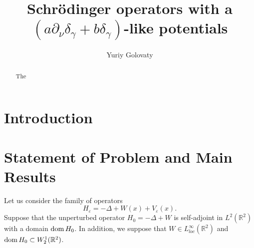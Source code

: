 \documentclass[reqno]{amsart}
\theoremstyle{plain}
\numberwithin{equation}{section}
\newcommand{\dom}{\mathop{\rm dom}}
\newcommand{\Real}{\mathbb R}
\newcommand{\eps}{\varepsilon}
\begin{document}
\title[Schr\"{o}dinger operators with a $(a\partial_\nu\delta_\gamma+b\delta_\gamma)$-like potentials]
{Schr\"{o}dinger operators with a $(a\partial_\nu\delta_\gamma+b\delta_\gamma)$-like potentials}





\author{Yuriy Golovaty}%
\address{Department of Mechanics and Mathematics,
  Ivan Franko National University of Lviv\\
  1 Universytetska str., 79000 Lviv, Ukraine}



\begin{abstract}
The
\end{abstract}


\keywords{}
\maketitle






\section{Introduction  }
\label{Sec:Introduction}













\section{Statement of Problem and Main Results}
\label{Sec:Statment}

Let us consider the family of operators
\begin{equation}\label{OprHe}
H_\eps=-\Delta +W(x)+V_\eps(x).
\end{equation}
Suppose that the unperturbed operator $H_0=-\Delta +W$ is self-adjoint in $L^2(\Real^2)$ with a domain $\dom H_0$. In addition, we suppose  that $W\in L^\infty_{loc}(\Real^2)$ and  $\dom H_0\subset W_2^1(\Real^2)$.
\end{document}
